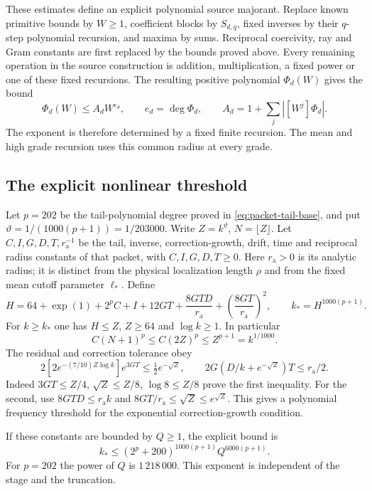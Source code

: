 \documentclass[11pt]{article}
\theoremstyle{definition}
\begin{document}
These estimates define an explicit polynomial source majorant. Replace
known primitive bounds by $W\geq1$, coefficient blocks by $S_{d,q}$,
fixed inverses by their $q$-step polynomial recursion, and maxima by
sums. Reciprocal coercivity, ray and Gram constants are first replaced
by the bounds proved above. Every remaining operation in the
source construction is addition, multiplication, a fixed
power or one of these fixed recursions. The resulting positive
polynomial $\Phi_d(W)$ gives the bound
\[
 \Phi_d(W)\leq A_dW^{e_d},\qquad
 e_d=\deg\Phi_d,\qquad A_d=1+\sum_j|[W^j]\Phi_d|.
\]
The exponent is therefore determined by a fixed finite recursion.
The mean and high grade recursion uses this common radius at every grade.

\subsection{The explicit nonlinear threshold}

Let $p=202$ be the tail-polynomial degree proved in
\eqref{eq:packet-tail-base}, and put
$\vartheta=1/(1000(p+1))=1/203000$. Write
$Z=k^\vartheta$, $N=\lfloor Z\rfloor$. Let $C,I,G,D,T,r_{\mathrm a}^{-1}$
be the tail, inverse, correction-growth, drift, time and reciprocal
radius constants of that packet, with $C,I,G,D,T\geq0$.
Here $r_{\mathrm a}>0$ is its analytic
radius; it is distinct from the physical localization length $\rho$ and
from the fixed mean cutoff parameter $\ell_*$. Define
\begin{equation}\label{eq:source-cap}
 H=64+\exp(1)+2^pC+I+12GT+\frac{8GTD}{r_{\mathrm a}}
                   +\left(\frac{8GT}{r_{\mathrm a}}\right)^2,\qquad
 k_*=H^{1000(p+1)}.
\end{equation}
For $k\geq k_*$ one has $H\leq Z$, $Z\geq64$ and $\log k\geq1$.
In particular
\[
 C(N+1)^p\leq C(2Z)^p\leq Z^{p+1}=k^{1/1000}.
\]
The residual and correction tolerance obey
\[
 2[2e^{-(7/10)Z\log k}]e^{3GT}\leq\tfrac12e^{-\sqrt Z},
 \qquad
 2G(D/k+e^{-\sqrt Z})T\leq r_{\mathrm a}/2.
\]
Indeed $3GT\leq Z/4$, $\sqrt Z\leq Z/8$, $\log8\leq Z/8$ prove
the first inequality. For the second, use
$8GTD\leq r_{\mathrm a}k$ and
$8GT/r_{\mathrm a}\leq\sqrt Z\leq e^{\sqrt Z}$.
This gives a polynomial frequency threshold for the exponential
correction-growth condition.

If these constants are bounded by $Q\geq1$, the explicit bound is
\begin{equation}\label{eq:polynomial-frequency-threshold}
 k_*\leq(2^p+200)^{1000(p+1)}Q^{6000(p+1)}.
\end{equation}
For $p=202$ the power of $Q$ is $1\,218\,000$. This exponent is
independent of the stage and the truncation.
\end{document}
